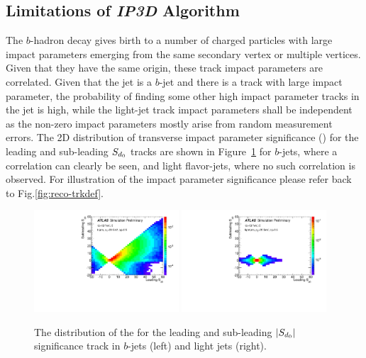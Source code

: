 \subsection{Limitations of \textit{IP3D} Algorithm}

The $b$-hadron decay gives birth to a number of charged particles with large impact parameters emerging from the same secondary vertex or multiple vertices. Given that they have the same origin, these track impact parameters are correlated. Given that the jet is a $b$-jet and there is a track with large impact parameter, the probability of finding some other high impact parameter tracks in the jet is high, while the light-jet track impact parameters shall be independent as the non-zero impact parameters mostly arise from random measurement errors. The 2D distribution of transverse impact parameter significance (\sdip) for the leading and sub-leading $S_{d{_0}}$ tracks are shown in Figure~\ref{fig:ip_corr} for $b$-jets, where a correlation can clearly be seen, and light flavor-jets, where no such correlation is observed. For illustration of the impact parameter significance please refer back to Fig.\ref{fig:reco-trkdef}.


\begin{figure}[htbp]
  \centering
   \includegraphics[width=0.48\textwidth]{figures/RNN/Sd0_2d_B.pdf}
 \includegraphics[width=0.48\textwidth]{figures/RNN/Sd0_2d_L.pdf}
\caption{The distribution of the \sdip for the leading and sub-leading $|S_{d{_0}}|$ significance track in $b$-jets (left) and light jets (right). }
  \label{fig:ip_corr}
\end{figure}

